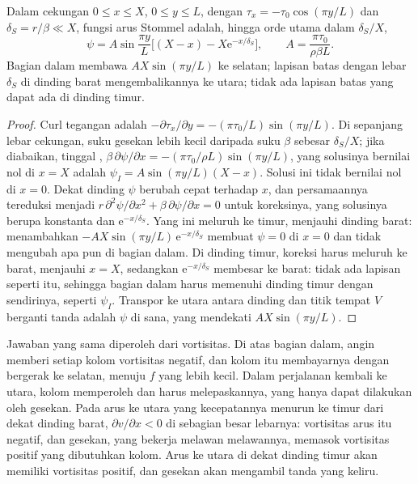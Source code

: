 \begin{theorem}\label{thm:b3:ocean-dynamics:stommel}
Dalam cekungan $0 \le x \le X$, $0 \le y \le L$, dengan $\tau_x = -\tau_0
\cos(\pi y/L)$ dan $\delta_S = r/\beta \ll X$, fungsi arus Stommel
adalah, hingga orde utama dalam $\delta_S/X$,
\[
\psi = A\sin\frac{\pi y}{L}\Big[(X - x) - X\mathrm e^{-x/\delta_S}\Big],
\qquad A = \frac{\pi\tau_0}{\rho\beta L} .
\]
Bagian dalam membawa $AX\sin(\pi y/L)$ ke selatan; lapisan batas dengan lebar
$\delta_S$ di dinding barat mengembalikannya ke utara; tidak ada lapisan batas yang dapat
ada di dinding timur.
\end{theorem}

\begin{proof}
Curl tegangan adalah $-\partial\tau_x/\partial y = -(\pi\tau_0/L)\sin(\pi
y/L)$. Di sepanjang lebar cekungan, suku gesekan lebih kecil daripada suku
$\beta$ sebesar $\delta_S/X$; jika diabaikan, tinggal ,
$\beta\,\partial\psi/\partial x = -(\pi\tau_0/\rho L)\sin(\pi y/L)$, yang
solusinya bernilai nol di $x = X$ adalah $\psi_I = A\sin(\pi y/L)(X - x)$. Solusi ini tidak
bernilai nol di $x = 0$. Dekat dinding $\psi$ berubah cepat terhadap $x$, dan
persamaannya tereduksi menjadi $r\,\partial^2\psi/\partial x^2 + \beta\,\partial\psi/
\partial x = 0$ untuk koreksinya, yang solusinya berupa konstanta dan
$\mathrm e^{-x/\delta_S}$. Yang ini meluruh ke timur, menjauhi
dinding barat: menambahkan $-AX\sin(\pi y/L)\,\mathrm e^{-x/\delta_S}$ membuat $\psi = 0$
di $x = 0$ dan tidak mengubah apa pun di bagian dalam. Di dinding timur, koreksi
harus meluruh ke barat, menjauhi $x = X$, sedangkan
$\mathrm e^{-x/\delta_S}$ membesar ke barat: tidak ada lapisan seperti itu, sehingga
bagian dalam harus memenuhi dinding timur dengan sendirinya, seperti $\psi_I$. Transpor
ke utara antara dinding dan titik tempat $V$ berganti tanda
adalah $\psi$ di sana, yang mendekati $AX\sin(\pi y/L)$.
\end{proof}

Jawaban yang sama diperoleh dari vortisitas. Di atas bagian dalam, angin memberi
setiap kolom vortisitas negatif, dan kolom itu membayarnya dengan bergerak
ke selatan, menuju $f$ yang lebih kecil. Dalam perjalanan kembali ke utara, kolom memperoleh 
dan harus melepaskannya, yang hanya dapat dilakukan oleh gesekan. Pada arus ke utara
yang kecepatannya menurun ke timur dari dekat dinding barat, $\partial
v/\partial x < 0$ di sebagian besar lebarnya: vortisitas arus itu negatif, dan gesekan, yang bekerja melawan
melawannya, memasok vortisitas positif yang dibutuhkan kolom. Arus ke utara
di dekat dinding timur akan memiliki vortisitas positif, dan
gesekan akan mengambil tanda yang keliru.

